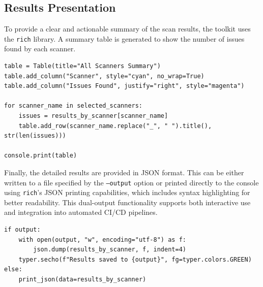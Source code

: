 \subsection{Results Presentation}


To provide a clear and actionable summary of the scan results, the toolkit uses the \texttt{rich} library. A summary table is generated to show the number of issues found by each scanner.

\begin{verbatim}
table = Table(title="All Scanners Summary")
table.add_column("Scanner", style="cyan", no_wrap=True)
table.add_column("Issues Found", justify="right", style="magenta")

for scanner_name in selected_scanners:
    issues = results_by_scanner[scanner_name]
    table.add_row(scanner_name.replace("_", " ").title(), str(len(issues)))

console.print(table)
\end{verbatim}

Finally, the detailed results are provided in JSON format. This can be either written to a file specified by the \texttt{--output} option or printed directly to the console using \texttt{rich}'s JSON printing capabilities, which includes syntax highlighting for better readability. This dual-output functionality supports both interactive use and integration into automated CI/CD pipelines.

\begin{verbatim}
if output:
    with open(output, "w", encoding="utf-8") as f:
        json.dump(results_by_scanner, f, indent=4)
    typer.secho(f"Results saved to {output}", fg=typer.colors.GREEN)
else:
    print_json(data=results_by_scanner)
\end{verbatim}